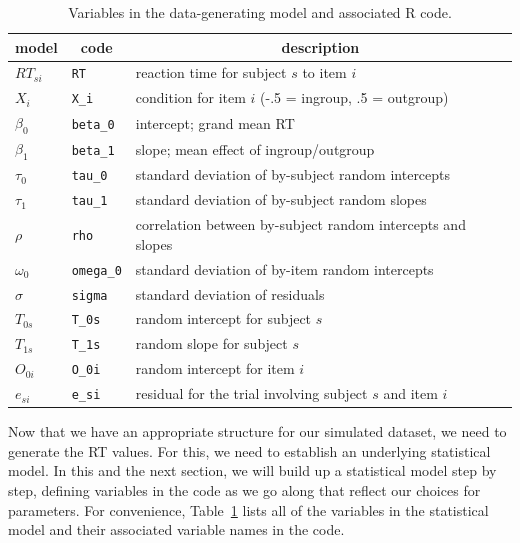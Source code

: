 \documentclass[
  english,
  doc,floatsintext]{apa6}
\begin{document}
\begin{table}[H]

\begin{center}
\begin{threeparttable}

\caption{\label{tab:paramdef}Variables in the data-generating model and associated R code.}

\begin{tabular}{lll}
\toprule
model & \multicolumn{1}{c}{code} & \multicolumn{1}{c}{description}\\
\midrule
$RT_{si}$ & \texttt{RT} & reaction time for subject $s$ to item $i$\\
$X_i$ & \texttt{X\_i} & condition for item $i$ (-.5 = ingroup, .5 = outgroup)\\
$\beta_0$ & \texttt{beta\_0} & intercept; grand mean RT\\
$\beta_1$ & \texttt{beta\_1} & slope; mean effect of ingroup/outgroup\\
$\tau_0$ & \texttt{tau\_0} & standard deviation of by-subject random intercepts\\
$\tau_1$ & \texttt{tau\_1} & standard deviation of by-subject random slopes\\
$\rho$ & \texttt{rho} & correlation between by-subject random intercepts and slopes\\
$\omega_0$ & \texttt{omega\_0} & standard deviation of by-item random intercepts\\
$\sigma$ & \texttt{sigma} & standard deviation of residuals\\
$T_{0s}$ & \texttt{T\_0s} & random intercept for subject $s$\\
$T_{1s}$ & \texttt{T\_1s} & random slope for subject $s$\\
$O_{0i}$ & \texttt{O\_0i} & random intercept for item $i$\\
$e_{si}$ & \texttt{e\_si} & residual for the trial involving subject $s$ and item $i$\\
\bottomrule
\end{tabular}

\end{threeparttable}
\end{center}

\end{table}

Now that we have an appropriate structure for our simulated dataset, we need to generate the RT values. For this, we need to establish an underlying statistical model. In this and the next section, we will build up a statistical model step by step, defining variables in the code as we go along that reflect our choices for parameters. For convenience, Table~\ref{tab:paramdef} lists all of the variables in the statistical model and their associated variable names in the code.
\end{document}
